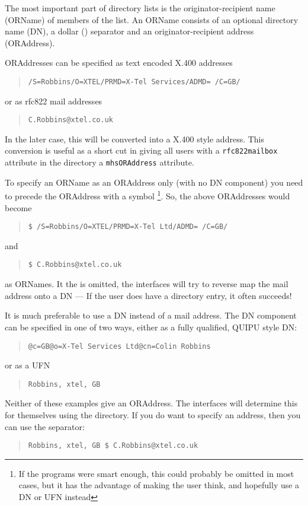 The most important part of directory lists is the originator-recipient
name (ORName) of members of the list.
An ORName consists of an optional directory name (DN), a dollar
(\option{\$}) separator and an originator-recipient address (ORAddress).

ORAddresses can be specified as text encoded X.400 addresses
\begin{quote}\begin{verbatim}
/S=Robbins/O=XTEL/PRMD=X-Tel Services/ADMD= /C=GB/
\end{verbatim}\end{quote}
or as rfc822 mail addresses 
\begin{quote}\begin{verbatim}
C.Robbins@xtel.co.uk
\end{verbatim}\end{quote}
In the later case, this will be converted into a X.400 style address.
This conversion is useful as a short cut in giving all users with a
\verb+rfc822mailbox+ attribute in the
directory a \verb+mhsORAddress+ attribute.

To specify an ORName as an ORAddress only (with no DN component) you
need to precede the ORAddress with a \option{\$} symbol
\footnote{If the programs were smart enough, this could probably be
omitted in most cases, but it has the advantage of making the user
think, and hopefully use a DN or UFN instead}.
So, the above ORAddresses would become
\begin{quote}\begin{verbatim}
$ /S=Robbins/O=XTEL/PRMD=X-Tel Ltd/ADMD= /C=GB/
\end{verbatim}\end{quote}
and
\begin{quote}\begin{verbatim}
$ C.Robbins@xtel.co.uk
\end{verbatim}\end{quote}
as ORNames.
It the \option{\$} is omitted, the interfaces will try to reverse map
the mail address onto a DN --- If the user does have a directory
entry, it often succeeds!

It is much preferable to use a DN instead of a mail address.  The DN
component can be specified in one of two ways, either as a fully
qualified, QUIPU style DN:
\begin{quote}\begin{verbatim}
@c=GB@o=X-Tel Services Ltd@cn=Colin Robbins
\end{verbatim}\end{quote}
or as a UFN
\begin{quote}\begin{verbatim}
Robbins, xtel, GB
\end{verbatim}\end{quote}
Neither of these examples give an ORAddress.  The interfaces will
determine this for themselves using the directory.
If you do want to specify an address, then you can use the \option{\$}
separator:
\begin{quote}\begin{verbatim}
Robbins, xtel, GB $ C.Robbins@xtel.co.uk
\end{verbatim}\end{quote}

